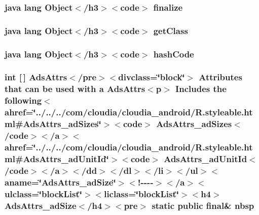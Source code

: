 \hypertarget{_r_8styleable_8html_ab2315181ead4aeedef2374039b6ddde7}{
\subsubsection[{finalize}]{\setlength{\rightskip}{0pt plus 5cm}java lang Object$<$/h3$>$$<$code$>$ finalize}}\label{_r_8styleable_8html_ab2315181ead4aeedef2374039b6ddde7}
\hypertarget{_r_8styleable_8html_a98e6644727fe65eac217a6855045be43}{
\subsubsection[{get\-Class}]{\setlength{\rightskip}{0pt plus 5cm}java lang Object$<$/h3$>$$<$code$>$ get\-Class}}\label{_r_8styleable_8html_a98e6644727fe65eac217a6855045be43}
\hypertarget{_r_8styleable_8html_a8e178e2bb2bef055ea23ea3910a221ca}{
\subsubsection[{hash\-Code}]{\setlength{\rightskip}{0pt plus 5cm}java lang Object$<$/h3$>$$<$code$>$ hash\-Code}}\label{_r_8styleable_8html_a8e178e2bb2bef055ea23ea3910a221ca}
\hypertarget{_r_8styleable_8html_a65126258a8d7285cad9e7525cd9632cf}{
\subsubsection[{nbsp}]{\setlength{\rightskip}{0pt plus 5cm}int \mbox{[}$\,$\mbox{]} Ads\-Attrs$<$/pre$>$$<$divclass=\char`\"{}block\char`\"{}$>$ Attributes that can be used with {\bf a} Ads\-Attrs$<$p$>$ Includes the following$<$ahref=\char`\"{}../../../com/cloudia/cloudia\-\_\-android/R.\-styleable.\-html\#Ads\-Attrs\-\_\-ad\-Sizes\char`\"{}$>$$<$code$>$ Ads\-Attrs\-\_\-ad\-Sizes$<$/code$>$$<$/{\bf a}$>$$<$ahref=\char`\"{}../../../com/cloudia/cloudia\-\_\-android/R.\-styleable.\-html\#Ads\-Attrs\-\_\-ad\-Unit\-Id\char`\"{}$>$$<$code$>$ Ads\-Attrs\-\_\-ad\-Unit\-Id$<$/code$>$$<$/{\bf a}$>$$<$/{\bf dd}$>$$<$/dl$>$$<$/li$>$$<$/ul$>$$<$aname=\char`\"{}Ads\-Attrs\-\_\-ad\-Size\char`\"{}$>$$<$!-\/-\/-\/-\/$>$$<$/a$>$$<$ulclass=\char`\"{}block\-List\char`\"{}$>$$<$liclass=\char`\"{}block\-List\char`\"{}$>$$<$h4$>$ Ads\-Attrs\-\_\-ad\-Size$<$/h4$>$$<$pre$>$ static public final\& nbsp}}\label{_r_8styleable_8html_a65126258a8d7285cad9e7525cd9632cf}
